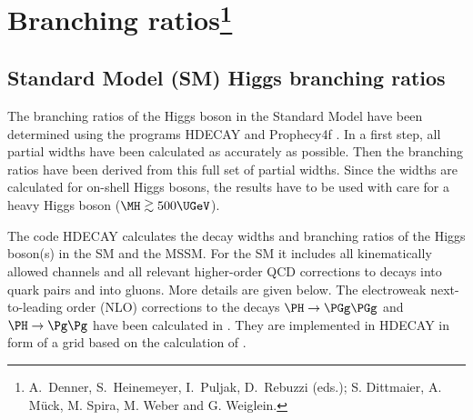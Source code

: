 \section{Branching ratios\footnote{A.~Denner, S.~Heinemeyer,
    I.~Puljak, D.~Rebuzzi (eds.); S. Dittmaier, A. M\"uck, M. Spira,
    M. Weber and G. Weiglein.}}


\label{sec:BR}


\subsection{Standard Model (SM) Higgs branching ratios}
\label{sec:SM-BR}

\providecommand{\lsim}
{\;\raisebox{-.3em}{$\stackrel{\displaystyle <}{\sim}$}\;}
\providecommand{\gsim}
{\;\raisebox{-.3em}{$\stackrel{\displaystyle >}{\sim}$}\;}


\providecommand{\HDECAY}{{\sc HDECAY}}
\providecommand{\HIGLU}{{\sc HIGLU}}
\providecommand{\Prophecy}{{\sc Prophecy4f}}
\providecommand{\CPsuperH}{{\sc CPsuperH}}
\providecommand{\FeynHiggs}{{\sc FeynHiggs}}


The branching ratios of the Higgs boson in the Standard Model have
been determined using the programs {\sc HDECAY}
\cite{Djouadi:1997yw,Spira:1997dg,hdecay2}
and {\sc Prophecy4f}
\cite{Bredenstein:2006rh,Bredenstein:2006ha,Prophecy4f}. In a first
step, all partial widths have been calculated as accurately as
possible. Then the branching ratios have been derived from this full
set of partial widths. Since the widths are calculated for on-shell
Higgs bosons, the results have to be used with care for a heavy Higgs
boson ($\MH\gsim500\UGeV$).

The code {\sc HDECAY} calculates the decay widths and branching ratios
of the Higgs boson(s) in the SM and the MSSM. For the SM it includes
all kinematically allowed channels and all relevant higher-order
QCD corrections to decays into quark pairs and into gluons. More
details are given below.
%
The electroweak next-to-leading order (NLO)
corrections to the decays $\PH\to\PGg\PGg$ and
$\PH\to \Pg\Pg$ have been calculated in
.
They are implemented in {\sc HDECAY} in form of a grid based on the
calculation of .


